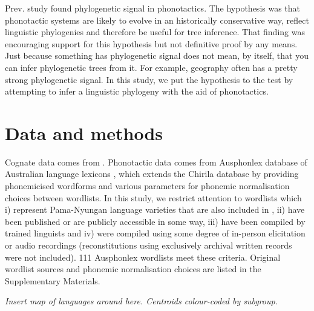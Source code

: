 Prev. study \autocite{macklin-cordes_phylogenetic_2020} found phylogenetic signal in phonotactics. The hypothesis was that phonotactic systems are likely to evolve in an historically conservative way, reflect linguistic phylogenies and therefore be useful for tree inference. That finding was encouraging support for this hypothesis but not definitive proof by any means. Just because something has phylogenetic signal does not mean, by itself, that you can infer phylogenetic trees from it. For example, geography often has a pretty strong phylogenetic signal. In this study, we put the hypothesis to the test by attempting to infer a linguistic phylogeny with the aid of phonotactics.

\hypertarget{pn-tree-methods}{%
\section{Data and methods}\label{pn-tree-methods}}

Cognate data comes from \autocite{bouckaert_origin_2018}. Phonotactic data comes from Ausphonlex database of Australian language lexicons \autocite{round_ausphon-lexicon_2017}, which extends the Chirila database \autocite{bowern_chirila_2016} by providing phonemicised wordforms and various parameters for phonemic normalisation choices between wordlists. In this study, we restrict attention to wordlists which i) represent Pama-Nyungan language varieties that are also included in \textcite{bouckaert_origin_2018}, ii) have been published or are publicly accessible in some way, iii) have been compiled by trained linguists and iv) were compiled using some degree of in-person elicitation or audio recordings (reconstitutions using exclusively archival written records were not included). 111 Ausphonlex wordlists meet these criteria. Original wordlist sources and phonemic normalisation choices are listed in the Supplementary Materials.

\emph{Insert map of languages around here. Centroids colour-coded by subgroup.}

